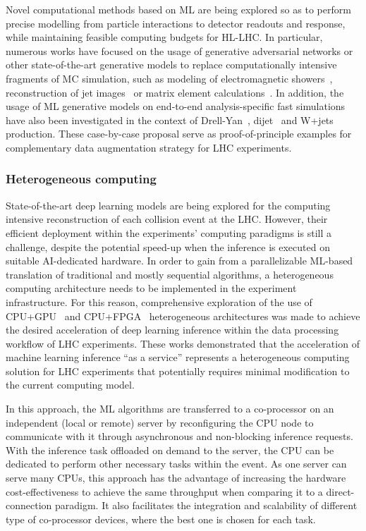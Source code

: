 Novel computational methods based on ML are being explored so as to perform precise modelling from particle interactions to detector readouts and response, while maintaining feasible computing budgets for HL-LHC. In particular, numerous works have focused on the usage of generative adversarial networks or other state-of-the-art generative models to replace computationally intensive fragments of MC simulation, such as modeling of electromagnetic showers~\cite{Paganini:2017dwg,Paganini:2017hrr,deOliveira:2017pjk}, reconstruction of jet images~\cite{Musella:2018rdi} or matrix element calculations~\cite{Bendavid:2017zhk}. In addition, the usage of ML generative models on end-to-end analysis-specific fast simulations have also been investigated in the context of Drell-Yan~\cite{Hashemi:2019fkn}, dijet~\cite{DiSipio:2019imz} and W+jets~\cite{Chen:2020uds} production. These case-by-case proposal serve as proof-of-principle examples for complementary data augmentation strategy for LHC experiments.

\subsubsection{Heterogeneous computing}

State-of-the-art deep learning models are being explored for the computing intensive reconstruction of each collision event at the LHC. However, their efficient deployment within the experiments' computing paradigms is still a challenge, despite the potential speed-up when the inference is executed on suitable AI-dedicated hardware. In order to gain from a parallelizable ML-based translation of traditional and mostly sequential algorithms, a heterogeneous computing architecture needs to be implemented in the experiment infrastructure. For this reason, comprehensive exploration of the use of CPU+GPU~\cite{Krupa:2020bwg} and CPU+FPGA~\cite{Duarte:2019fta,Rankin:2020usv} heterogeneous architectures  was made to achieve the desired acceleration of deep learning inference within the data processing workflow of LHC experiments. These works demonstrated that the acceleration of machine learning inference ``as a service'' represents a heterogeneous computing solution for LHC experiments that  potentially requires minimal modification to the current computing model. 

In this approach, the ML algorithms are transferred to a co-processor on an independent (local or remote) server by reconfiguring the CPU node to communicate with it through asynchronous and non-blocking inference requests.
With the inference task offloaded on demand to the server,  the CPU can be dedicated to perform other necessary tasks within the event.
As one server can serve many CPUs, this approach has the advantage of increasing the hardware cost-effectiveness to achieve the same throughput when comparing it to a direct-connection paradigm.
It also facilitates the integration and scalability of different type of co-processor devices, where the best one is chosen for each task. 

